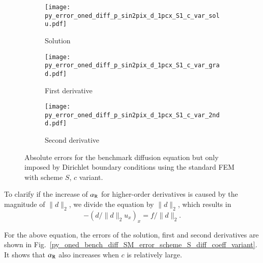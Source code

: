 \documentclass[review,3p]{elsarticle}
\begin{document}
\begin{figure}[!ht]
    \begin{subfigure}{5.5cm}
        \texttt{[image: py\_error\_oned\_diff\_p\_sin2pix\_d\_1pcx\_S1\_c\_var\_solu.pdf]}
        \caption{Solution}
        \label{py_error_oned_diff_p_sin2pix_d_1pcx_S1_c_var_solu}
    \end{subfigure}
    \hspace{-0.2cm}
    \begin{subfigure}{5.5cm}
        \texttt{[image: py\_error\_oned\_diff\_p\_sin2pix\_d\_1pcx\_S1\_c\_var\_grad.pdf]}
        \caption{First derivative}
        \label{py_error_oned_diff_p_sin2pix_d_1pcx_S1_c_var_grad}
    \end{subfigure}
    \hspace{-0.2cm}
    \begin{subfigure}{5.5cm}
        \texttt{[image: py\_error\_oned\_diff\_p\_sin2pix\_d\_1pcx\_S1\_c\_var\_2ndd.pdf]}
        \caption{Second derivative}
        \label{py_error_oned_diff_p_sin2pix_d_1pcx_S1_c_var_2ndd}
    \end{subfigure}
\caption{Absolute errors for the benchmark diffusion equation but only imposed by Dirichlet boundary conditions using the standard FEM with scheme $S$, $c$ variant.}
\label{py_error_oned_diff_p_sin2pix_d_1pcx_S1_c_var}
\end{figure}

To clarify if the increase of $\alpha_{\rm R}$ for higher-order derivatives is caused by the magnitude of $\|d\|_2$, we divide the equation by $\|d\|_2$, which results in
\begin{equation}
 -(d/{\|d\|_2} u_x)_x = f/{\|d\|_2}.             \label{diff_eq_coeff_scaling}
\end{equation}

For the above equation, the errors of the solution, first and second derivatives are shown in Fig.~\ref{py_oned_bench_diff_SM_error_scheme_S_diff_coeff_variant}. It shows that $\alpha_{\rm R}$ also increases when $c$ is relatively large.
\end{document}
